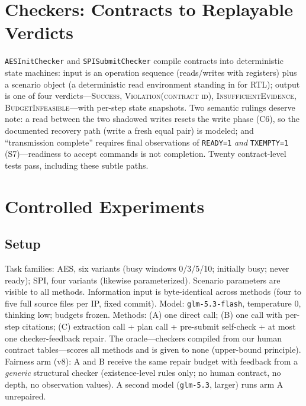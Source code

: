 \documentclass[conference]{IEEEtran}
\begin{document}
\section{Checkers: Contracts to Replayable Verdicts}
\label{sec:checker}
\texttt{AESInitChecker} and \texttt{SPISubmitChecker} compile contracts
into deterministic state machines: input is an operation sequence
(reads/writes with registers) plus a scenario object (a deterministic
read environment standing in for RTL); output is one of four
verdicts---\textsc{Success}, \textsc{Violation(contract id)},
\textsc{InsufficientEvidence}, \textsc{BudgetInfeasible}---with
per-step state snapshots. Two semantic rulings deserve note: a read
between the two shadowed writes resets the write phase (C6), so the
documented recovery path (write a fresh equal pair) is modeled; and
``transmission complete'' requires final observations of
\texttt{READY=1} \emph{and} \texttt{TXEMPTY=1} (S7)---readiness to
accept commands is not completion. Twenty contract-level tests pass,
including these subtle paths.

\section{Controlled Experiments}
\label{sec:exp}

\subsection{Setup}
Task families: AES, six variants (busy windows 0/3/5/10; initially
busy; never ready); SPI, four variants (likewise parameterized).
Scenario parameters are visible to all methods. Information input is
byte-identical across methods (four to five full source files per IP,
fixed commit). Model: \texttt{glm-5.3-flash}, temperature 0, thinking
low; budgets frozen. Methods: (A) one direct call; (B) one call with
per-step citations; (C) extraction call + plan call + pre-submit
self-check + at most one checker-feedback repair. The oracle---checkers
compiled from our human contract tables---scores all methods and is
given to none (upper-bound principle). Fairness arm (v8): A and B
receive the same repair budget with feedback from a \emph{generic}
structural checker (existence-level rules only; no human contract, no
depth, no observation values). A second model (\texttt{glm-5.3},
larger) runs arm A unrepaired.
\end{document}
